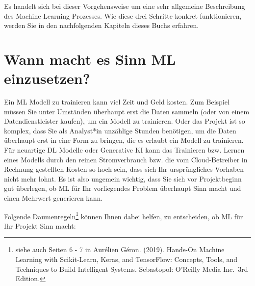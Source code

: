 \documentclass[
]{book}
\begin{document}
Es handelt sich bei dieser Vorgehensweise um eine sehr allgemeine Beschreibung des Machine Learning Prozesses. Wie diese drei Schritte konkret funktionieren, werden Sie in den nachfolgenden Kapiteln dieses Buchs erfahren.

\hypertarget{wann-macht-es-sinn-ml-einzusetzen}{%
\section{Wann macht es Sinn ML einzusetzen?}\label{wann-macht-es-sinn-ml-einzusetzen}}

Ein ML Modell zu trainieren kann viel Zeit und Geld kosten. Zum Beispiel müssen Sie unter Umständen überhaupt erst die Daten sammeln (oder von einem Datendienstleister kaufen), um ein Modell zu trainieren. Oder das Projekt ist so komplex, dass Sie als Analyst*in unzählige Stunden benötigen, um die Daten überhaupt erst in eine Form zu bringen, die es erlaubt ein Modell zu trainieren. Für neuartige DL Modelle oder Generative KI kann das Trainieren bzw. Lernen eines Modells durch den reinen Stromverbrauch bzw. die vom Cloud-Betreiber in Rechnung gestellten Kosten so hoch sein, dass sich Ihr ursprüngliches Vorhaben nicht mehr lohnt. Es ist also ungemein wichtig, dass Sie sich vor Projektbeginn gut überlegen, ob ML für Ihr vorliegendes Problem überhaupt Sinn macht und einen Mehrwert generieren kann.

Folgende Daumenregeln\footnote{siehe auch Seiten 6 - 7 in Aurélien Géron. (2019). Hands-On Machine Learning with Scikit-Learn, Keras, and TensorFlow: Concepts, Tools, and Techniques to Build Intelligent Systems. Sebastopol: O'Reilly Media Inc.~3rd Edition.} können Ihnen dabei helfen, zu entscheiden, ob ML für Ihr Projekt Sinn macht:
\end{document}
